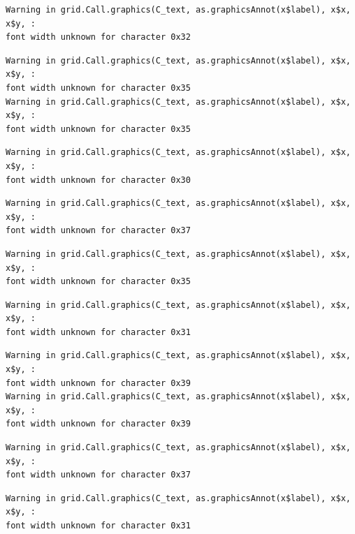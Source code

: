 \documentclass[
  letterpaper,
]{scrbook}
\begin{document}
\begin{verbatim}
Warning in grid.Call.graphics(C_text, as.graphicsAnnot(x$label), x$x, x$y, :
font width unknown for character 0x32
\end{verbatim}

\begin{verbatim}
Warning in grid.Call.graphics(C_text, as.graphicsAnnot(x$label), x$x, x$y, :
font width unknown for character 0x35
Warning in grid.Call.graphics(C_text, as.graphicsAnnot(x$label), x$x, x$y, :
font width unknown for character 0x35
\end{verbatim}

\begin{verbatim}
Warning in grid.Call.graphics(C_text, as.graphicsAnnot(x$label), x$x, x$y, :
font width unknown for character 0x30
\end{verbatim}

\begin{verbatim}
Warning in grid.Call.graphics(C_text, as.graphicsAnnot(x$label), x$x, x$y, :
font width unknown for character 0x37
\end{verbatim}

\begin{verbatim}
Warning in grid.Call.graphics(C_text, as.graphicsAnnot(x$label), x$x, x$y, :
font width unknown for character 0x35
\end{verbatim}

\begin{verbatim}
Warning in grid.Call.graphics(C_text, as.graphicsAnnot(x$label), x$x, x$y, :
font width unknown for character 0x31
\end{verbatim}

\begin{verbatim}
Warning in grid.Call.graphics(C_text, as.graphicsAnnot(x$label), x$x, x$y, :
font width unknown for character 0x39
Warning in grid.Call.graphics(C_text, as.graphicsAnnot(x$label), x$x, x$y, :
font width unknown for character 0x39
\end{verbatim}

\begin{verbatim}
Warning in grid.Call.graphics(C_text, as.graphicsAnnot(x$label), x$x, x$y, :
font width unknown for character 0x37
\end{verbatim}

\begin{verbatim}
Warning in grid.Call.graphics(C_text, as.graphicsAnnot(x$label), x$x, x$y, :
font width unknown for character 0x31
\end{verbatim}
\end{document}
